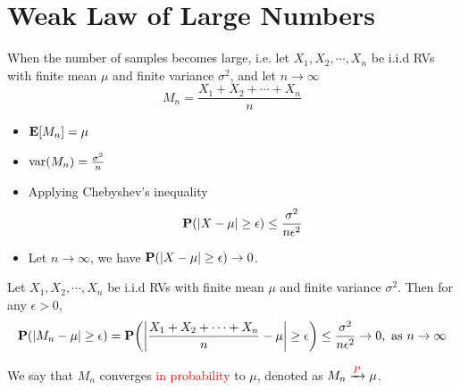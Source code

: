 \section{Weak Law of Large Numbers}
When the number of samples becomes large, i.e. let $X_1, X_2, \cdots, X_n$ be i.i.d RVs with finite mean $\mu$ and finite variance $\sigma^2$, and let $n \to \infty$
\begin{equation}
    M_n = \frac{X_1 + X_2 + \cdots + X_n}{n}
\end{equation}
\begin{itemize}
    \item $\mathbf{E}[M_n] = \mu$
    \item $\mathrm{var}(M_n) = \frac{\sigma^2}{n}$
    \item Applying Chebyshev's inequality
    \begin{equation}
        \mathbf{P}(\abs{X - \mu} \geq \epsilon) \leq \frac{\sigma^2}{n\epsilon^2}
    \end{equation}
    \item Let $n \to \infty$, we have $\mathbf{P}(\abs{X - \mu} \geq \epsilon) \to 0$.
\end{itemize}
\begin{theorem}
    Let $X_1, X_2, \cdots, X_n$ be i.i.d RVs with finite mean $\mu$ and finite variance $\sigma^2$. Then for any $\epsilon > 0$,
    \begin{equation}
        \mathbf{P}(\abs{M_n - \mu} \geq \epsilon) = \mathbf{P}\qty(\abs{\frac{X_1 + X_2 + \cdots + X_n}{n} - \mu} \geq \epsilon) \leq \frac{\sigma^2}{n\epsilon^2} \to 0, \text{ as } n \to \infty
    \end{equation}
\end{theorem}
We say that $M_n$ converges \textcolor{red}{in probability} to $\mu$, denoted as $M_n \xrightarrow{\textcolor{red}{P}} \mu$.

